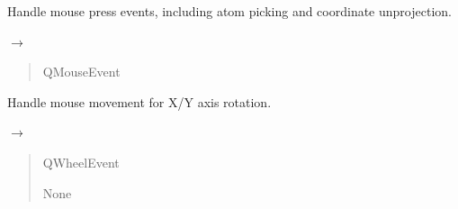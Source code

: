 \documentclass[a4paper,10pt,english,openany,oneside]{sphinxmanual}
\begin{document}
\begin{fulllineitems}
\begin{fulllineitems}
\sphinxAtStartPar
Handle mouse press events, including atom picking and coordinate un\sphinxhyphen{}projection.

\end{fulllineitems}


\begin{fulllineitems}
\label{\detokenize{api/ui:picogl.ui.backend.qt.base.GLBase.mouseMoveEvent}}
\pysigstartsignatures
\pysiglinewithargsret
{}
{}
{{ $\rightarrow$ }}
\pysigstopsignatures\begin{quote}\begin{description}
\sphinxAtStartPar
{} \textendash{} QMouseEvent

\end{description}\end{quote}

\sphinxAtStartPar
Handle mouse movement for X/Y axis rotation.

\end{fulllineitems}


\begin{fulllineitems}
\label{\detokenize{api/ui:picogl.ui.backend.qt.base.GLBase.wheelEvent}}
\pysigstartsignatures
\pysiglinewithargsret
{}
{}
{{ $\rightarrow$ }}
\pysigstopsignatures\begin{quote}\begin{description}
\sphinxAtStartPar
{} \textendash{} QWheelEvent

\sphinxAtStartPar
None

\end{description}\end{quote}


\end{fulllineitems}
\end{fulllineitems}
\end{document}
